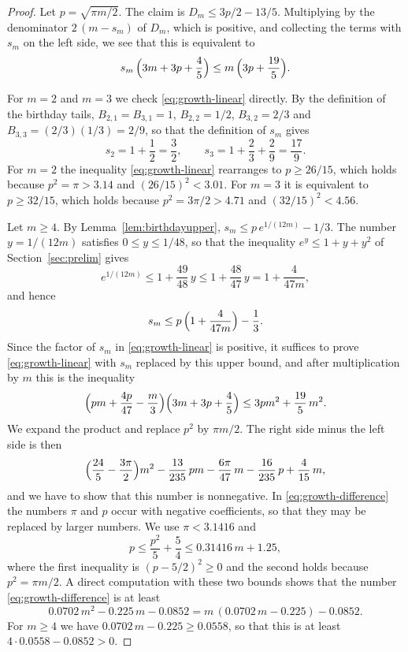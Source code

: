 \documentclass{amsart}
\theoremstyle{definition}
\theoremstyle{remark}
\numberwithin{equation}{section}
\begin{document}
\begin{proof}
Let $p=\sqrt{\pi m/2}$. The claim is $D_m\le3p/2-13/5$. Multiplying by the
denominator $2\,(m-s_m)$ of $D_m$, which is positive, and collecting the
terms with $s_m$ on the left side, we see that this is equivalent to
\begin{equation}\label{eq:growth-linear}
s_m\,\Bigl(3m+3p+\frac45\Bigr)\le m\,\Bigl(3p+\frac{19}5\Bigr).
\end{equation}

For $m=2$ and $m=3$ we check \eqref{eq:growth-linear} directly. By the
definition of the birthday tails, $B_{2,1}=B_{3,1}=1$, $B_{2,2}=1/2$,
$B_{3,2}=2/3$ and $B_{3,3}=(2/3)(1/3)=2/9$, so that the definition of $s_m$
gives
\[
s_2=1+\frac12=\frac32,\qquad s_3=1+\frac23+\frac29=\frac{17}9 .
\]
For $m=2$ the inequality \eqref{eq:growth-linear} rearranges to
$p\ge26/15$, which
holds because $p^2=\pi>3.14$ and $(26/15)^2<3.01$. For $m=3$ it is
equivalent to $p\ge32/15$, which holds because $p^2=3\pi/2>4.71$ and
$(32/15)^2<4.56$.

Let $m\ge4$. By Lemma~\ref{lem:birthdayupper},
$s_m\le p\,e^{1/(12m)}-1/3$. The number $y=1/(12m)$ satisfies
$0\le y\le1/48$, so that the inequality $e^{y}\le1+y+y^2$ of
Section~\ref{sec:prelim} gives
\[
e^{1/(12m)}\le1+\frac{49}{48}\,y\le1+\frac{48}{47}\,y=1+\frac{4}{47m},
\]
and hence
\[
s_m\le p\,\Bigl(1+\frac{4}{47m}\Bigr)-\frac13 .
\]
Since the factor of $s_m$ in \eqref{eq:growth-linear} is positive, it
suffices to prove \eqref{eq:growth-linear} with $s_m$ replaced by this upper
bound, and after multiplication by $m$ this is the inequality
\[
\Bigl(pm+\frac{4p}{47}-\frac m3\Bigr)\Bigl(3m+3p+\frac45\Bigr)
\le3pm^2+\frac{19}5\,m^2 .
\]
We expand the product and replace $p^2$ by $\pi m/2$. The right side minus
the left side is then
\begin{equation}\label{eq:growth-difference}
\Bigl(\frac{24}5-\frac{3\pi}2\Bigr)m^2-\frac{13}{235}\,pm
-\frac{6\pi}{47}\,m-\frac{16}{235}\,p+\frac4{15}\,m,
\end{equation}
and we have to show that this number is nonnegative. In
\eqref{eq:growth-difference} the numbers $\pi$ and $p$ occur with negative
coefficients, so that they may be replaced by larger numbers. We use
$\pi<3.1416$ and
\[
p\le\frac{p^2}5+\frac54\le0.31416\,m+1.25,
\]
where the first inequality is $(p-5/2)^2\ge0$ and the second holds because
$p^2=\pi m/2$. A direct computation with these two bounds shows that the
number \eqref{eq:growth-difference} is at least
\[
0.0702\,m^2-0.225\,m-0.0852=m\,(0.0702\,m-0.225)-0.0852 .
\]
For $m\ge4$ we have $0.0702\,m-0.225\ge0.0558$, so that this is at least
$4\cdot0.0558-0.0852>0$.
\end{proof}
\end{document}

